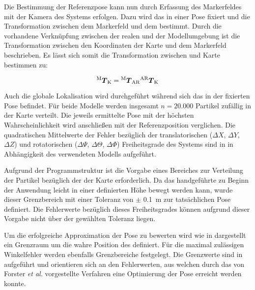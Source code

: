 Die Bestimmung der Referenzpose kann nun durch Erfassung des Markerfeldes mit der Kamera des Systems erfolgen. Dazu wird das \kps{} in einer Pose fixiert und die Transformation zwischen dem Markerfeld und dem \kps{} bestimmt. Durch die vorhandene Verknüpfung zwischen der realen und der Modellumgebung ist die Transformation zwischen den Koordinaten der Karte und dem Markerfeld beschrieben\red[ Bild?]. Es lässt sich somit die Transformation zwischen \kps{} und Karte bestimmen zu:

\begin{equation}
{^{\mathrm{M}}\mbox{\boldmath{$T$}}_{\mathrm{K}}} = {^{\mathrm{M}}\mbox{\boldmath{$T$}}_{\mathrm{AR}}}{^{\mathrm{AR}}\mbox{\boldmath{$T$}}_{\mathrm{K}}}
\end{equation}

Auch die globale Lokalisation wird durchgeführt während sich das \kps{} in der fixierten Pose befindet. Für beide Modelle werden insgesamt $n=20.000$ Partikel zufällig in der Karte verteilt. Die jeweils ermittelte Pose mit der höchsten Wahrscheinlichkeit wird anschließen mit der Referenzposition verglichen. Die quadratischen Mittelwerte der Fehler bezüglich der translatorischen ($\Delta X$, $\Delta Y$, $\Delta Z$) und rotatorischen ($\Delta \Psi$, $\Delta \Theta$, $\Delta \Phi$) Freiheitsgrade des Systems sind in  in Abhängigkeit des verwendeten Modells aufgeführt.\\





Aufgrund der Programmstruktur ist die Vorgabe eines Bereiches zur Verteilung der Partikel bezüglich der \red[z-Koordinate] der Karte erforderlich. Da das handgeführte \kps{} zu Beginn der Anwendung leicht in einer definierten Höhe bewegt werden kann, wurde dieser Grenzbereich mit einer Toleranz von $\pm$ \SI{0,1}{\meter} zur tatsächlichen Pose definiert. Die Fehlerwerte bezüglich dieses Freiheitsgrades können aufgrund dieser Vorgabe nicht über der gewählten Toleranz liegen.\\



Um die erfolgreiche Approximation der Pose zu bewerten wird wie in  dargestellt ein Grenzraum um die wahre Position des  definiert. Für die maximal zulässigen Winkelfehler werden ebenfalls Grenzbereiche festgelegt. Die Grenzwerte sind in  aufgeführt und orientieren sich an den Fehlerwerten, aus welchen durch das von Forster \textit{et al.} \cite{Forster2013} vorgestellte Verfahren eine Optimierung der Pose erreicht werden konnte.\\

